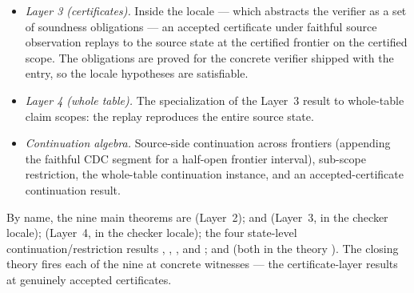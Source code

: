\documentclass[11pt,a4paper]{article}
\begin{document}
\begin{itemize}
\item \emph{Layer 3 (certificates).} Inside the
  locale --- which abstracts the verifier as a set of soundness
  obligations --- an accepted certificate under faithful source
  observation replays to the source state at the certified frontier
  on the certified scope. The obligations are proved for the concrete
  verifier shipped with the entry, so the locale hypotheses are
  satisfiable.
\item \emph{Layer 4 (whole table).} The specialization of the Layer~3
  result to whole-table claim scopes: the replay reproduces the
  entire source state.
\item \emph{Continuation algebra.} Source-side continuation across
  frontiers (appending the faithful CDC segment for a half-open
  frontier interval), sub-scope restriction, the whole-table
  continuation instance, and an accepted-certificate continuation
  result.
\end{itemize}

By name, the nine main theorems are
(Layer~2);
and 
(Layer~3, in the checker locale);
(Layer~4, in the checker locale); the four state-level
continuation/restriction results
,
,
,
and
;
and
(both in the theory ). The
closing theory fires each of the nine at concrete witnesses ---
the certificate-layer results at genuinely accepted certificates.
\end{document}

